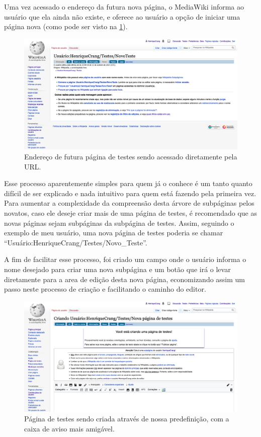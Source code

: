 Uma vez acessado o endereço da futura nova página, o MediaWiki informa ao usuário que ela ainda não existe, e oferece ao usuário a opção de iniciar uma página nova (como pode ser visto na \ref{fig:criacao_pagina_url}). 

\begin{figure}[H]
    \centering
    \includegraphics[width=1\textwidth]{Images/criacao_pagina_url.png}
    \caption{Endereço de futura página de testes sendo acessado diretamente pela URL.}
    \label{fig:criacao_pagina_url}
\end{figure}

Esse processo aparentemente simples para quem já o conhece é um tanto quanto difícil de ser explicado e nada intuitivo para quem está fazendo pela primeira vez. Para aumentar a complexidade da compreensão desta árvore de subpáginas pelos novatos, caso ele deseje criar mais de uma página de testes, é recomendado que as novas páginas sejam subpáginas da subpágina de testes. Assim, seguindo o exemplo de meu usuário, uma nova página de testes poderia se chamar ``Usuário:HenriqueCrang/Testes/Novo\_Teste''.

A fim de facilitar esse processo, foi criado um campo onde o usuário informa o nome desejado para criar uma nova subpágina e um botão que irá o levar diretamente para a area de edição desta nova página, economizando assim um passo neste processo de criação e facilitando o caminho do editor.

\begin{figure}[H]
    \centering
    \includegraphics[width=1\textwidth]{Images/criacao_pagina_com_template.png}
    \caption{Página de testes sendo criada através de nossa predefinição, com a caixa de aviso mais amigável.}
    \label{fig:criacao_pagina_com_template}
\end{figure}

